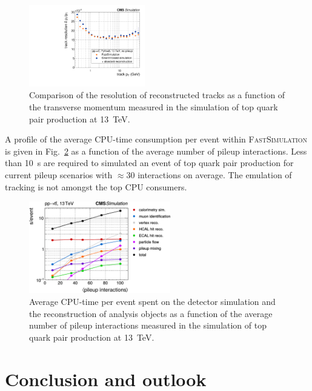 \documentclass[a4paper]{jpconf}
\begin{document}
\begin{figure}[htbp]
\begin{center}
\includegraphics[width=0.45\textwidth]{figures/res_pt.pdf}
\caption{\label{fig:res-track}Comparison of the resolution of reconstructed tracks as a function of the transverse momentum measured in the simulation of top quark pair production at 13~TeV.}
\end{center}
\end{figure}

A profile of the average CPU-time consumption per event within \textsc{FastSimulation} is given in Fig.~\ref{fig:cpu} as a function of the average number of pileup interactions. Less than 10~s are required to simulated an event of top quark pair production for current pileup scenarios with $\approx30$ interactions on average. The emulation of tracking is not amongst the top CPU consumers.



\begin{figure}[htbp]
\begin{center}
\includegraphics[width=0.55\textwidth]{figures/cpu_profile.pdf}
\caption{\label{fig:cpu}Average CPU-time per event spent on the detector simulation and the reconstruction of analysis objects as a function of the average number of pileup interactions measured in the simulation of top quark pair production at 13~TeV.}
\end{center}
\end{figure}

\section{Conclusion and outlook}
\end{document}

